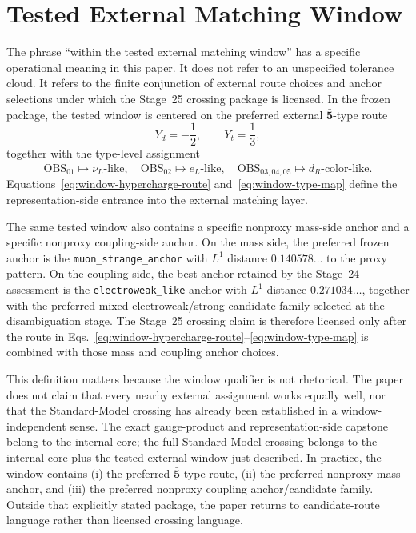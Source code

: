 \documentclass[11pt]{article}
\begin{document}
\section{Tested External Matching Window}
The phrase ``within the tested external matching window'' has a specific operational meaning in this paper. It does not refer to an unspecified tolerance cloud. It refers to the finite conjunction of external route choices and anchor selections under which the Stage~25 crossing package is licensed. In the frozen package, the tested window is centered on the preferred external $\bar{\mathbf{5}}$-type route
\begin{equation}
Y_d=-\frac{1}{2},
\qquad
Y_t=\frac{1}{3},
\label{eq:window-hypercharge-route}
\end{equation}
together with the type-level assignment
\begin{equation}
\mathrm{OBS}_{01}\mapsto \nu_L\text{-like},\quad
\mathrm{OBS}_{02}\mapsto e_L\text{-like},\quad
\mathrm{OBS}_{03,04,05}\mapsto \bar d_R\text{-color-like}.
\label{eq:window-type-map}
\end{equation}
Equations~\eqref{eq:window-hypercharge-route} and~\eqref{eq:window-type-map} define the representation-side entrance into the external matching layer.

The same tested window also contains a specific nonproxy mass-side anchor and a specific nonproxy coupling-side anchor. On the mass side, the preferred frozen anchor is the \texttt{muon\_strange\_anchor} with $L^1$ distance $0.140578\ldots$ to the proxy pattern. On the coupling side, the best anchor retained by the Stage~24 assessment is the \texttt{electroweak\_like} anchor with $L^1$ distance $0.271034\ldots$, together with the preferred mixed electroweak/strong candidate family selected at the disambiguation stage. The Stage~25 crossing claim is therefore licensed only after the route in Eqs.~\eqref{eq:window-hypercharge-route}--\eqref{eq:window-type-map} is combined with those mass and coupling anchor choices.

This definition matters because the window qualifier is not rhetorical. The paper does not claim that every nearby external assignment works equally well, nor that the Standard-Model crossing has already been established in a window-independent sense. The exact gauge-product and representation-side capstone belong to the internal core; the full Standard-Model crossing belongs to the internal core plus the tested external window just described. In practice, the window contains (i) the preferred $\bar{\mathbf{5}}$-type route, (ii) the preferred nonproxy mass anchor, and (iii) the preferred nonproxy coupling anchor/candidate family. Outside that explicitly stated package, the paper returns to candidate-route language rather than licensed crossing language.
\end{document}
